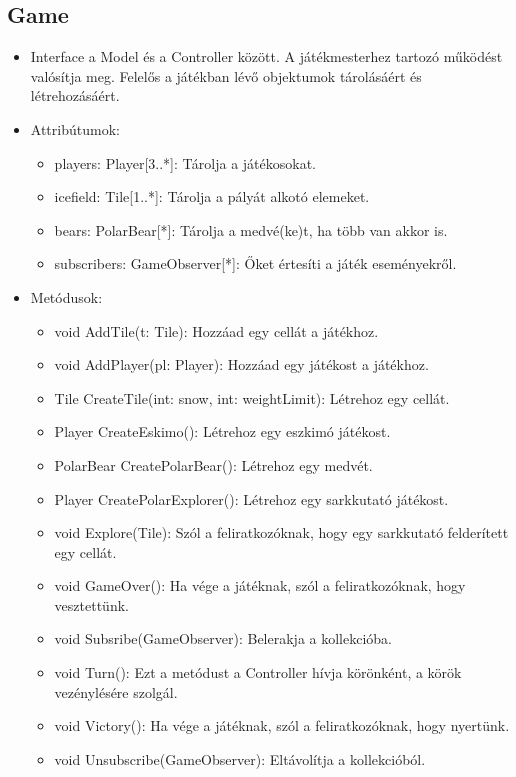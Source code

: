 \subsection{Game}
\begin{itemize}
	\item Interface a Model és a Controller között. A játékmesterhez tartozó működést valósítja meg. Felelős a játékban lévő objektumok tárolásáért és létrehozásáért.
	\item Attribútumok:
	\begin{itemize}
		\item players: Player[3..*]: Tárolja a játékosokat.
		\item icefield: Tile[1..*]: Tárolja a pályát alkotó elemeket.
		\item bears: PolarBear[*]: Tárolja a medvé(ke)t, ha több van akkor is.
		\item subscribers: GameObserver[*]:  Őket értesíti a játék eseményekről.
	\end{itemize}
	\item Metódusok:
	\begin{itemize}
		\item void AddTile(t: Tile): Hozzáad egy cellát a játékhoz.
		\item void AddPlayer(pl: Player): Hozzáad egy játékost a játékhoz.
		\item Tile CreateTile(int: snow, int: weightLimit): Létrehoz egy cellát. 
		\item Player CreateEskimo(): Létrehoz egy eszkimó játékost.
		\item PolarBear CreatePolarBear(): Létrehoz egy medvét.
		\item Player CreatePolarExplorer(): Létrehoz egy sarkkutató játékost.
		\item void Explore(Tile): Szól a feliratkozóknak, hogy egy sarkkutató felderített egy cellát.
		\item void GameOver(): Ha vége a játéknak, szól a feliratkozóknak, hogy vesztettünk.
		\item void Subsribe(GameObserver): Belerakja a kollekcióba.
		\item void Turn(): Ezt a metódust a Controller hívja körönként, a körök vezénylésére szolgál. 
		\item void Victory(): Ha vége a játéknak, szól a feliratkozóknak, hogy nyertünk.
		\item void Unsubscribe(GameObserver): Eltávolítja a kollekcióból.
	\end{itemize}
\end{itemize}

